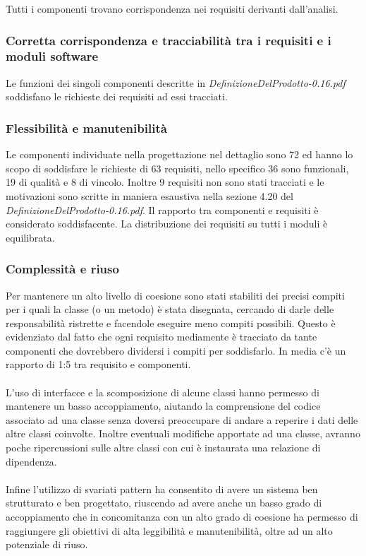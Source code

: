 Tutti i componenti trovano corrispondenza nei requisiti derivanti dall'analisi.

\subsubsection*{Corretta corrispondenza e tracciabilit\`a tra i requisiti e i
moduli software} 
Le funzioni dei singoli componenti descritte in
\emph{DefinizioneDelProdotto-0.16.pdf} soddisfano le richieste dei requisiti ad
essi tracciati.

\subsubsection*{Flessibilit\`a e manutenibilit\`a}
Le componenti individuate nella progettazione nel dettaglio sono 72 ed
hanno lo scopo di soddisfare le richieste di 63 requisiti, nello specifico 36
sono funzionali, 19 di qualit\`a e 8 di vincolo. Inoltre 9 requisiti non sono
stati tracciati e le motivazioni sono scritte in maniera esaustiva nella sezione
4.20 del \emph{DefinizioneDelProdotto-0.16.pdf}. Il rapporto tra componenti e
requisiti \`e considerato soddisfacente. La distribuzione dei
requisiti su tutti i moduli \`e equilibrata.

\subsubsection*{Complessit\`a e riuso}
Per mantenere un alto livello di coesione sono stati stabiliti dei precisi
compiti per i quali la classe (o un metodo) \`e stata disegnata, cercando di
darle delle responsabilit\`a ristrette e facendole eseguire meno compiti
possibili. Questo \`e evidenziato dal fatto che ogni requisito mediamente \`e
tracciato da tante componenti che dovrebbero dividersi i compiti per
soddisfarlo. In media c'\`e un rapporto di 1:5 tra requisito e componenti. \\\\
L'uso di interfacce e la scomposizione di alcune classi hanno permesso di
mantenere un basso accoppiamento, aiutando la comprensione del codice associato
ad una classe senza doversi preoccupare di andare a reperire i dati delle altre
classi coinvolte. Inoltre eventuali modifiche apportate ad una classe, avranno
poche ripercussioni sulle altre classi con cui \`e instaurata una relazione di
dipendenza. \\\\
Infine l'utilizzo di svariati pattern ha consentito di avere un sistema ben
strutturato e ben progettato, riuscendo ad avere anche un basso grado di
accoppiamento che in concomitanza con un alto grado di coesione ha permesso di
raggiungere gli obiettivi di alta leggibilit\`a e manutenibilit\`a, oltre ad un
alto potenziale di riuso.

